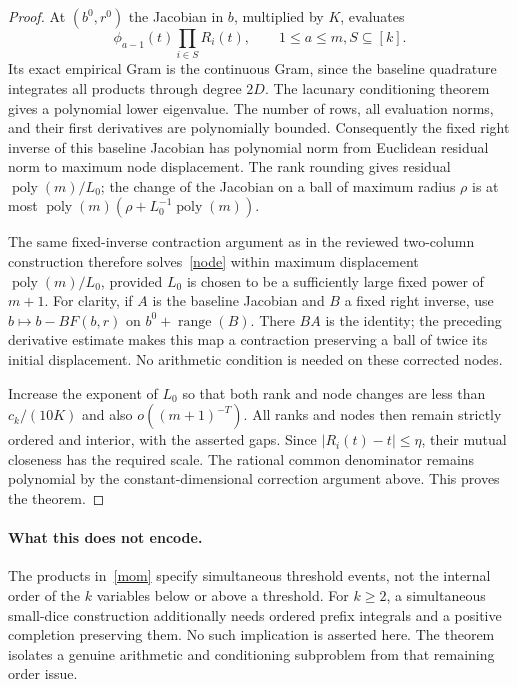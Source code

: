 \documentclass[11pt]{article}
\begin{document}
\begin{proof}
At $(b^0,r^0)$ the Jacobian in $b$, multiplied by $K$, evaluates
\[
 \phi_{a-1}(t)\prod_{i\in S}R_i(t),
 \qquad 1\le a\le m, S\subseteq[k].
\]
Its exact empirical Gram is the continuous Gram, since the baseline
quadrature integrates all products through degree $2D$.
The lacunary conditioning theorem gives a polynomial lower eigenvalue.
The number of rows, all evaluation norms, and their first derivatives
are polynomially bounded. Consequently the fixed right inverse of
this baseline Jacobian has polynomial norm from Euclidean residual
norm to maximum node displacement. The rank rounding gives residual
$\operatorname{poly}(m)/L_0$; the change of the Jacobian on a ball of
maximum radius $\rho$ is at most
$\operatorname{poly}(m)(\rho+L_0^{-1}\operatorname{poly}(m))$.

The same fixed-inverse contraction argument as in the reviewed
two-column construction therefore solves~\eqref{node} within
maximum displacement $\operatorname{poly}(m)/L_0$, provided $L_0$
is chosen to be a sufficiently large fixed power of $m+1$.
For clarity, if $A$ is the baseline Jacobian and $B$ a fixed right
inverse, use $b\mapsto b-BF(b,r)$ on
$b^0+\operatorname{range}(B)$. There $BA$ is the identity; the
preceding derivative estimate makes this map a contraction preserving
a ball of twice its initial displacement. No arithmetic condition
is needed on these corrected nodes.

Increase the exponent of $L_0$ so that both rank and node changes
are less than $c_k/(10K)$ and also $o((m+1)^{-T})$.
All ranks and nodes then remain strictly ordered and interior, with
the asserted gaps. Since $|R_i(t)-t|\le\eta$, their mutual closeness
has the required scale. The rational common denominator remains
polynomial by the constant-dimensional correction argument above.
This proves the theorem.
\end{proof}

\paragraph{What this does not encode.}
The products in~\eqref{mom} specify simultaneous threshold events,
not the internal order of the $k$ variables below or above a threshold.
For $k\ge2$, a simultaneous small-dice construction additionally needs
ordered prefix integrals and a positive completion preserving them.
No such implication is asserted here. The theorem isolates a genuine
arithmetic and conditioning subproblem from that remaining order issue.
\end{document}
